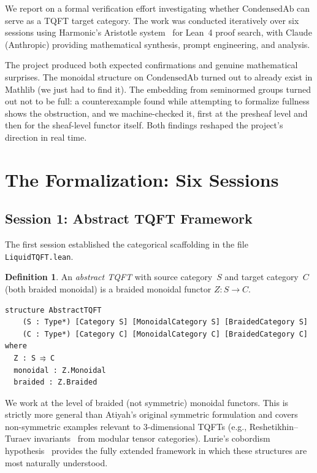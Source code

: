 \documentclass[11pt]{amsart}
\theoremstyle{plain}
\theoremstyle{definition}
\newtheorem{definition}[theorem]{Definition}
\newcommand{\CondAb}{\mathrm{CondensedAb}}
\begin{document}
We report on a formal verification effort investigating whether $\CondAb$ can serve as a TQFT target category. The work was conducted iteratively over six sessions using Harmonic's Aristotle system~\cite{Aristotle2025} for Lean~4 proof search, with Claude (Anthropic) providing mathematical synthesis, prompt engineering, and analysis.

The project produced both expected confirmations and genuine mathematical surprises. The monoidal structure on $\CondAb$ turned out to already exist in Mathlib (we just had to find it). The embedding from seminormed groups turned out not to be full: a counterexample found while attempting to formalize fullness shows the obstruction, and we machine-checked it, first at the presheaf level and then for the sheaf-level functor itself. Both findings reshaped the project's direction in real time.

\section{The Formalization: Six Sessions}
\label{sec:sessions}

\subsection{Session 1: Abstract TQFT Framework}

The first session established the categorical scaffolding in the file \texttt{LiquidTQFT.lean}.

\begin{definition}
An \emph{abstract TQFT} with source category~$S$ and target category~$C$ (both braided monoidal) is a braided monoidal functor $Z : S \to C$.
\end{definition}

\begin{lstlisting}
structure AbstractTQFT
    (S : Type*) [Category S] [MonoidalCategory S] [BraidedCategory S]
    (C : Type*) [Category C] [MonoidalCategory C] [BraidedCategory C] where
  Z : S ⥤ C
  monoidal : Z.Monoidal
  braided : Z.Braided
\end{lstlisting}

We work at the level of braided (not symmetric) monoidal functors. This is strictly more general than Atiyah's original symmetric formulation and covers non-symmetric examples relevant to 3-dimensional TQFTs (e.g., Reshetikhin--Turaev invariants~\cite{ReshetikhinTuraev1991} from modular tensor categories). Lurie's cobordism hypothesis~\cite{Lurie2009} provides the fully extended framework in which these structures are most naturally understood.
\end{document}

